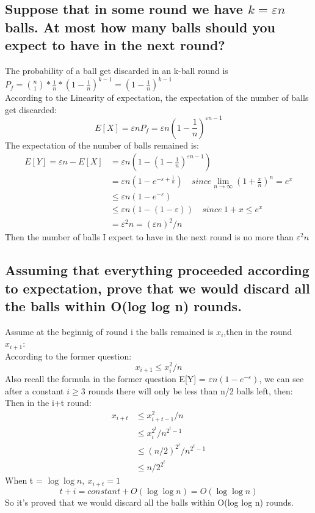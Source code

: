 \documentclass{article}
\begin{document}
\subsection{Suppose that in some round we have $k = \varepsilon n$ balls. At most how many balls should you expect to have in the next round?}
The probability of a ball get discarded in an k-ball round is $P_f = {n \choose 1}*\frac{1}{n}*(1-\frac{1}{n})^{k-1}=(1-\frac{1}{n})^{k-1}$\\
According to the Linearity of expectation, the expectation of the number of balls get discarded:
$$E[X]=\varepsilon n P_f = \varepsilon n(1-\frac{1}{n})^{\varepsilon n-1}$$
The expectation of the number of balls remained is: 
\begin{equation}
\begin{aligned}
E[Y]=\varepsilon n-E[X] &= \varepsilon n(1-(1-\frac{1}{n})^{\varepsilon n-1})\\
&=\varepsilon n(1-e^{-\varepsilon+\frac{1}{n}})\quad since\lim_{n \to \infty}(1+\frac{x}{n})^n=e^x\\
&\le \varepsilon n(1-e^{-\varepsilon})\\
&\le \varepsilon n(1-(1-\varepsilon) )\quad since\ 1+x \le e^x\\
&=\varepsilon^2n = (\varepsilon n)^2/n
\end{aligned}
\end{equation}
Then the number of balls I expect to have in the next round is no more than $\varepsilon^2n$
\subsection{Assuming that everything proceeded according to expectation, prove that we would
discard all the balls within O(log log n) rounds.}
Assume at the beginnig of round i the balls remained is $x_i$,then in the round $x_{i+1}$:\\
According to the former question:
$$x_{i+1} \le x_i^2/n$$
Also recall the formula in the former question E[Y] = $\varepsilon n(1-e^{-\varepsilon})$, we can see after a constant $i \ge 3$ rounds there will only be less than n/2 balls left, then: \\
Then in the i+t round:
\begin{equation}
\begin{aligned}
x_{i+t}&\le x_{i+t-1}^2/n\\
&\le x_i^{2^t}/n^{2^t-1}\\
&\le (n/2)^{2^t}/n^{2^t-1}\\
&\le n/2^{2^t}
\end{aligned}
\end{equation}
When t = $\log \log n,\ x_{i+t}=1$\\
$$t+i = constant + O(\log\log n)=O(\log\log n)$$
So it's proved that we would discard all the balls within O(log log n) rounds.
\end{document}

